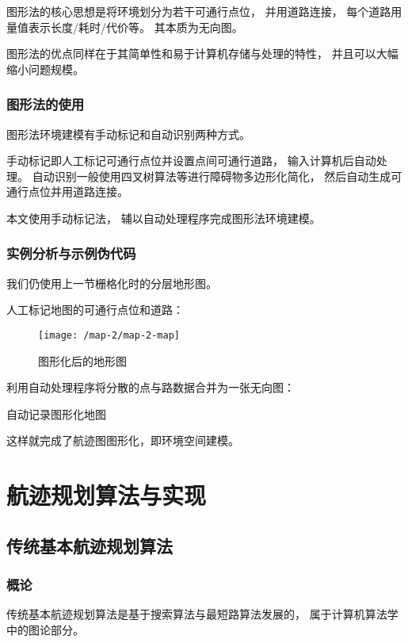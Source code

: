 \documentclass[12pt,a4paper,oneside,UTF8]{ctexart}
\begin{document}
图形法的核心思想是将环境划分为若干可通行点位，
并用道路连接，
每个道路用量值表示长度/耗时/代价等。
其本质为无向图。

图形法的优点同样在于其简单性和易于计算机存储与处理的特性，
并且可以大幅缩小问题规模。
\subsubsection{图形法的使用}
图形法环境建模有手动标记和自动识别两种方式。

手动标记即人工标记可通行点位并设置点间可通行道路，
输入计算机后自动处理。
自动识别一般使用四叉树算法等进行障碍物多边形化简化，
然后自动生成可通行点位并用道路连接。

本文使用手动标记法，
辅以自动处理程序完成图形法环境建模。
\subsubsection{实例分析与示例伪代码}
我们仍使用上一节栅格化时的分层地形图。

人工标记地图的可通行点位和道路：
\begin{figure}[H]
  \centering
  \texttt{[image: /map-2/map-2-map]}
  \caption{图形化后的地形图}
  \label{fig:map-2-map}
\end{figure}

利用自动处理程序将分散的点与路数据合并为一张无向图：

\begin{algorithm}[H]
  \caption{自动记录图形化地图}\label{algorithm-map-noted}

\end{algorithm}

这样就完成了航迹图图形化，即环境空间建模。
\newpage\section{航迹规划算法与实现}
\subsection{传统基本航迹规划算法}
\subsubsection{概论}
传统基本航迹规划算法是基于搜索算法与最短路算法发展的，
属于计算机算法学中的图论部分。
\end{document}
